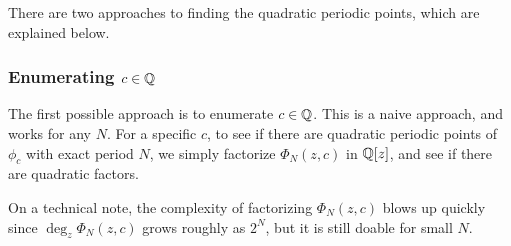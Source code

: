 There are two approaches to finding the quadratic periodic points,
which are explained below.

\subsubsection{Enumerating $c \in \mathbb{Q}$}

The first possible approach is to enumerate $c \in \mathbb{Q}$. This is a
naive approach, and works for any $N$. For a specific $c$, to see if
there are quadratic periodic points of $\phi_c$ with exact period $N$,
we simply factorize $\Phi_N(z, c)$ in $\mathbb{Q}[z]$, and see if there are
quadratic factors.

%
%
%
%
%
%
%

On a technical note, the complexity of factorizing $\Phi_N(z, c)$
blows up quickly since $\deg_z \Phi_N(z, c)$ grows roughly as $2^N$,
but it is still doable for small $N$.

